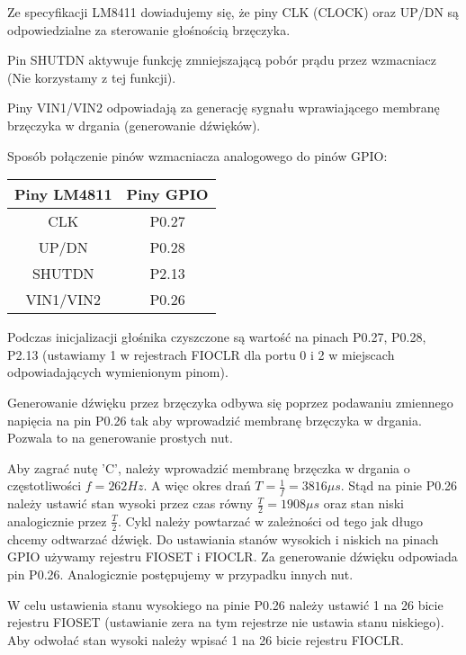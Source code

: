 \documentclass{classrep}
\begin{document}
		\medskip
		Ze specyfikacji LM8411 \cite{LM4811} dowiadujemy się, że piny CLK (CLOCK) oraz UP/DN
		są odpowiedzialne za sterowanie głośnością brzęczyka.
		
		
		Pin SHUTDN aktywuje funkcję zmniejszającą pobór prądu przez wzmacniacz (Nie korzystamy z tej funkcji).
		
		
		Piny VIN1/VIN2 odpowiadają za generację sygnału wprawiającego
		membranę brzęczyka w drgania (generowanie dźwięków).\\
		
		
		\begin{center}
			Sposób połączenie pinów wzmacniacza analogowego do pinów GPIO:\smallskip

			\begin{tabular}{|c|c|}
				\hline 
				\textbf{Piny LM4811} & \textbf{Piny GPIO} \\ 
				\hline 
				CLK & P0.27 \\ 
				\hline 
				UP/DN & P0.28 \\ 
				\hline 
				SHUTDN & P2.13 \\ 
				\hline 
				VIN1/VIN2 & P0.26 \\ 
				\hline 
			\end{tabular} 
		\end{center}
	
		Podczas inicjalizacji głośnika czyszczone są wartość na pinach P0.27, P0.28, P2.13 (ustawiamy 1 w rejestrach FIOCLR dla portu 0 i 2 w miejscach odpowiadających wymienionym pinom).
		
		
		Generowanie dźwięku przez brzęczyka odbywa się poprzez podawaniu zmiennego napięcia na pin P0.26 tak aby
		wprowadzić membranę brzęczyka w drgania. Pozwala to na generowanie prostych nut. 
		
		
		Aby zagrać nutę 'C', należy wprowadzić membranę brzęczka w drgania o częstotliwości $f=262Hz$. A więc okres drań $T=\frac{1}{f} = 3816 \mu s$. Stąd na pinie P0.26 należy ustawić stan wysoki przez czas równy $\frac{T}{2} = 1908\mu s$ oraz stan niski analogicznie przez  $\frac{T}{2}$. Cykl należy powtarzać w zależności od tego jak długo chcemy odtwarzać dźwięk. Do ustawiania stanów wysokich i niskich na pinach GPIO używamy rejestru FIOSET i FIOCLR. Za
		generowanie dźwięku odpowiada pin P0.26. Analogicznie postępujemy w przypadku innych nut.
		
		W celu ustawienia stanu wysokiego na pinie P0.26 należy ustawić 1 na 26 bicie rejestru FIOSET (ustawianie zera na tym rejestrze nie ustawia stanu niskiego). Aby odwołać stan wysoki należy wpisać 1 na 26 bicie rejestru FIOCLR.
\end{document}
